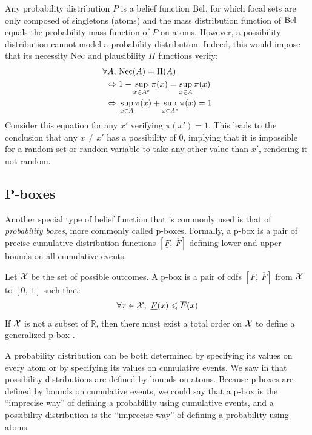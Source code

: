 \begin{remark}
    Any probability distribution $P$ is a belief function $\mathrm{Bel}$, for which focal sets are only composed of singletons (atoms) and the mass distribution function of $\mathrm{Bel}$ equals the probability mass function of $P$ on atoms. However, a possibility distribution cannot model a probability distribution. Indeed, this would impose that its necessity $\mathrm{Nec}$ and plausibility $\Pi$ functions verify:
    \begin{align*}
        \forall A, &~\mathrm{Nec}(A) = \Pi(A)\\
        \Leftrightarrow&~1-\sup_{x\in A^c}\pi(x) = \sup_{x\in A}\pi(x)\\
        \Leftrightarrow&~ \sup_{x\in A}\pi(x) + \sup_{x\in A^c}\pi(x) = 1
    \end{align*}
    Consider this equation for any $x'$ verifying $\pi(x')=1$. This leads to the conclusion that any $x\neq x'$ has a possibility of $0$, implying that it is impossible for a random set or random variable to take any other value than $x'$, rendering it not-random. 
\end{remark}

\subsection{P-boxes}\label{sec:pboxes}
Another special type of belief function that is commonly used is that of \textit{probability boxes}, more commonly called p-boxes. Formally, a p-box is a pair of precise cumulative distribution functions $[\underline{F}, ~\overline{F}]$ defining lower and upper bounds on all cumulative events:

\begin{definition}[P-box]\label{def:p-box}
    Let $\mathcal{X}$ be the set of possible outcomes. A p-box is a pair of \acrshort{cdf}s $[\underline{F}, ~\overline{F}]$ from $\mathcal{X}$ to $[0, ~1]$ such that:
    \begin{equation}
    	\forall x \in \mathcal{X},~\underline{F}(x) \leqslant \overline{F}(x) \label{eq:p-box}
    \end{equation}
    If $\mathcal{X}$ is not a subset of $\mathbb{R}$, then there must exist a total order on $\mathcal{X}$ to define a generalized p-box \cite{destercke_unifying_2008}. 
\end{definition}

\begin{remark}
    A probability distribution can be both determined by specifying its values on every atom or by specifying its values on cumulative events. We saw in  that possibility distributions are defined by bounds on atoms. Because p-boxes are defined by bounds on cumulative events, we could say that a p-box is the ``imprecise way'' of defining a probability using cumulative events, and a possibility distribution is the ``imprecise way'' of defining a probability using atoms.
\end{remark}

